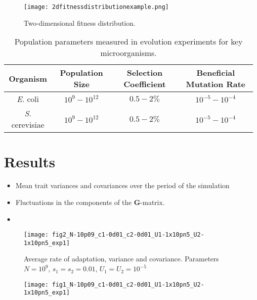 \documentclass[11pt,one column]{article}
\begin{document}
\begin{figure}[h]
	\centering
	\texttt{[image: 2dfitnessdistributionexample.png]} 
	\caption{Two-dimensional fitness distribution.} 
	\label{fig.1}
\end{figure}
	
\begin{table}[h]
	\centering
 	\begin{tabular}{ | c | c | c | c |}
    \hline
    Organism 												& Population Size 	& Selection Coefficient & Beneficial Mutation Rate \\ \hline
    \textit{E}. coli \cite{Perfeito2007}					& $10^9 - 10^{12}$ 	& $0.5 - 2 \%$  & $10^{-5} - 10^{-4}$ \\ \hline
    \textit{S}. cerevisiae \cite{desai2007speed,Levy2015}	& $10^9 - 10^{12}$ 	& $0.5 - 2 \%$  & $10^{-5} - 10^{-4}$ \\
    \hline
	\end{tabular}
	\caption{Population parameters measured in evolution experiments for key microorganisms.} 
	\label{Table 1}
\end{table}


\section*{Results}
\begin{itemize}
\item Mean trait variances and covariances over the period of the simulation
\item Fluctuations in the components of the \textbf{G}-matrix.
\item 
\end{itemize}

\begin{figure}[h]
\centering
\texttt{[image: fig2\_N-10p09\_c1-0d01\_c2-0d01\_U1-1x10pn5\_U2-1x10pn5\_exp1]}
\caption{Average rate of adaptation, variance and covariance. Parameters $N=10^9$, $s_1=s_2=0.01$, $U_1=U_2=10^{-5}$}
\label{fig.1}
\end{figure}

\begin{figure}[h]
\centering
\texttt{[image: fig1\_N-10p09\_c1-0d01\_c2-0d01\_U1-1x10pn5\_U2-1x10pn5\_exp1]}
\label{fig.2}
\end{figure}
\end{document}
